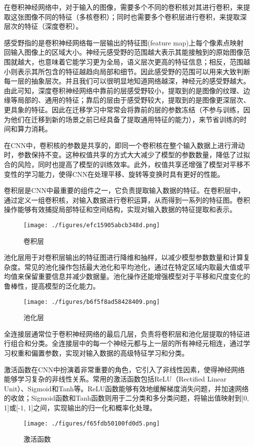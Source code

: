 


在卷积神经网络中，对于输入的图像，需要多个不同的卷积核对其进行卷积，来提取这张图像不同的特征（多核卷积）；同时也需要多个卷积层进行卷积，来提取深层次的特征（深度卷积）。

感受野指的是卷积神经网络每一层输出的特征图(feature map)上每个像素点映射回输入图像上的区域大小。神经元感受野的范围越大表示其能接触到的原始图像范围就越大，也意味着它能学习更为全局，语义层次更高的特征信息；相反，范围越小则表示其所包含的特征越趋向局部和细节。因此感受野的范围可以用来大致判断每一层的抽象层次。并且我们可以很明显地知道网络越深，神经元的感受野越大。由此可知，深度卷积神经网络中靠前的层感受野较小，提取到的是图像的纹理、边缘等局部的、通用的特征；靠后的层由于感受野较大，提取到的是图像更深层次、更具象的特征。因此在迁移学习中常常会将靠前的层的参数冻结（不参与训练，因为他们在迁移到新的场景之前已经具备了提取通用特征的能力），来节省训练的时间和算力消耗。

在CNN中，卷积核的参数是共享的，即同一个卷积核在整个输入数据上进行滑动时，参数保持不变。这种权值共享的方式大大减少了模型的参数数量，降低了过拟合的风险，同时也提高了模型的训练效率。此外，权值共享还增强了模型对平移不变性的学习能力，使得CNN在处理平移、旋转等变换时具有更好的性能。

卷积层是CNN中最重要的组件之一，它负责提取输入数据的特征。在卷积层中，通过定义一组卷积核，对输入数据进行卷积运算，从而得到一系列的特征图。卷积操作能够有效捕捉局部特征和空间结构，实现对输入数据的特征提取和表示。\begin{figure}[ht]
\centering
\texttt{[image: ./figures/efc15905abcb348d.png]}
\caption{卷积层} \label{fig_CNN3_1}
\end{figure}

池化层用于对卷积层输出的特征图进行降维和抽样，以减少模型参数数量和计算复杂度。常见的池化操作包括最大池化和平均池化，通过在特定区域内取最大值或平均值来保留重要信息并减少数据量。池化操作还能增强模型对于平移和尺度变化的鲁棒性，提高模型的泛化能力。

\begin{figure}[ht]
\centering
\texttt{[image: ./figures/b6f5f8ad58428409.png]}
\caption{池化层} \label{fig_CNN3_2}
\end{figure}

全连接层通常位于卷积神经网络的最后几层，负责将卷积层和池化层提取的特征进行组合和分类。全连接层中的每一个神经元都与上一层的所有神经元相连，通过学习权重和偏置参数，实现对输入数据的高级特征学习和分类。


激活函数在CNN中扮演着非常重要的角色，它引入了非线性因素，使得神经网络能够学习复杂的非线性关系。常用的激活函数包括ReLU（Rectified Linear Unit）、Sigmoid和Tanh等。ReLU函数能够有效地缓解梯度消失问题，并加速网络的收敛；Sigmoid函数和Tanh函数则用于二分类和多分类问题，将输出值映射到[0, 1]或[-1, 1]之间，实现输出的归一化和概率化处理。
\begin{figure}[ht]
\centering
\texttt{[image: ./figures/f65fdb50100fd0d5.png]}
\caption{激活函数} \label{fig_CNN3_3}
\end{figure}
